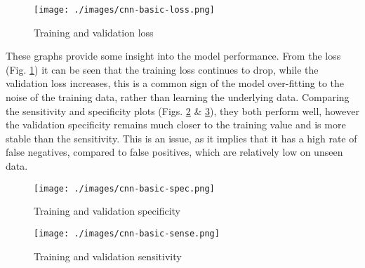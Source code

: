 \documentclass[12pt,a4paper,titlepage,twoside]{report}
\begin{document}
	\begin{figure}[t]
		\centering
		\texttt{[image: ./images/cnn-basic-loss.png]}
		\caption{Training and validation loss}
		\label{fig:cnn-basic-loss}
	\end{figure}
	
	These graphs provide some insight into the model performance. From the loss (Fig. \ref{fig:cnn-basic-loss}) it can be seen that the training loss continues to drop, while the validation loss increases, this is a common sign of the model over-fitting to the noise of the training data, rather than learning the underlying data. Comparing the sensitivity and specificity plots (Figs. \ref{fig:cnn-basic-spec} \& \ref{fig:cnn-basic-sense}), they both perform well, however the validation specificity remains much closer to the training value and is more stable than the sensitivity. This is an issue, as it implies that it has a high rate of false negatives, compared to false positives, which are relatively low on unseen data.
	
	\begin{minipage}[b]{\linewidth}
	\begin{minipage}{0.45\textwidth}
		\begin{figure}[H]
			\centering
			\texttt{[image: ./images/cnn-basic-spec.png]}
			\caption{Training and validation specificity}
			\label{fig:cnn-basic-spec}
		\end{figure}
	\end{minipage}%
	\hspace{1cm}%
	\begin{minipage}{0.45\textwidth}
		\centering
		\begin{figure}[H]
			\centering
			\texttt{[image: ./images/cnn-basic-sense.png]}
			\caption{Training and validation sensitivity}
			\label{fig:cnn-basic-sense}
		\end{figure}
	\end{minipage}%
	\end{minipage}
	
	
\end{document}
